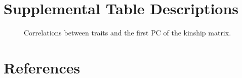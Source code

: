 \documentclass[10pt,letterpaper]{article}
\begin{document}
\begin{figure}[ht]
\centering
\caption{
}
\label{fig:trait_cor}
\end{figure}

\hypertarget{supplemental-table-descriptions}{%
\section{Supplemental Table
Descriptions}\label{supplemental-table-descriptions}}

\begin{figure}[ht]
\centering
\caption{Correlations between traits and the first PC of the kinship matrix.
}
\label{table:trait_cor}
\end{figure}

\hypertarget{references}{%
\section*{References}\label{references}}

\nolinenumbers
\end{document}
